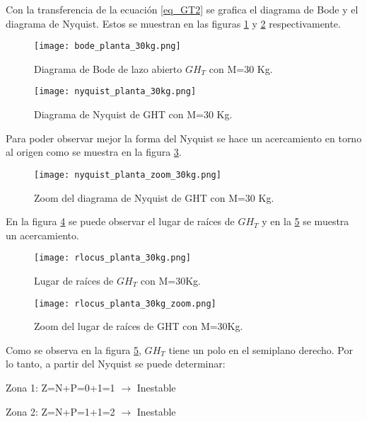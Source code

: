 \noindent Con la transferencia de la ecuación  \ref{eq_GT2} se  grafica el diagrama de Bode y el diagrama de Nyquist. Estos se muestran en las figuras \ref{fig:Diag_Bode_lazo_abierto_30kg} y \ref{fig:Diag_Nyquist_lazo_abierto_30kg} respectivamente.

\begin{figure}[H]
	\centering
	\texttt{[image: bode\_planta\_30kg.png]}
	\caption{Diagrama de Bode de lazo abierto $GH_T$ con M=30 Kg.}
	\label{fig:Diag_Bode_lazo_abierto_30kg}
\end{figure}

\begin{figure}[H]
	\centering
	\texttt{[image: nyquist\_planta\_30kg.png]}
	\caption{Diagrama de Nyquist de GHT con M=30 Kg.}
	\label{fig:Diag_Nyquist_lazo_abierto_30kg}
\end{figure}

\noindent Para poder observar mejor la forma del Nyquist se hace un acercamiento en torno al origen como se muestra en la figura \ref{fig:Diag_Nyquist_lazo_abierto_zoom_30kg}.

\begin{figure}[H]
	\centering
	\texttt{[image: nyquist\_planta\_zoom\_30kg.png]}
	\caption{Zoom del diagrama de Nyquist de GHT con M=30 Kg.}
	\label{fig:Diag_Nyquist_lazo_abierto_zoom_30kg}
\end{figure}

\noindent En la figura \ref{fig:rlocus_m30kg} se puede observar el lugar de raíces de $GH_{T}$ y en la \ref{fig:rlocus_m30kg_zoom} se muestra un acercamiento.

\begin{figure}[H]
	\centering
	\texttt{[image: rlocus\_planta\_30kg.png]}
	\caption{Lugar de raíces de $GH_{T}$ con M=30Kg.}
	\label{fig:rlocus_m30kg}
\end{figure}

\begin{figure}[H]
	\centering
	\texttt{[image: rlocus\_planta\_30kg\_zoom.png]}
	\caption{Zoom del lugar de raíces de GHT con M=30Kg.}
	\label{fig:rlocus_m30kg_zoom}
\end{figure}

\noindent Como se observa en la figura \ref{fig:rlocus_m30kg_zoom}, $GH_{T}$ tiene un polo en el semiplano derecho. Por lo tanto, a partir del Nyquist se puede determinar:

\noindent Zona 1: Z=N+P=0+1=1 $\mathrm{\to}$ Inestable 

\noindent Zona 2: Z=N+P=1+1=2 $\mathrm{\to}$ Inestable

